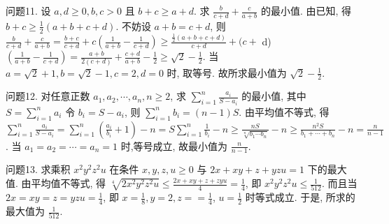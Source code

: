 问题11. 设 $a, d \geqslant 0, b, c>0$ 且 $b+c \geqslant a+d$. 求 $\frac{b}{c+d}+\frac{c}{a+b}$ 的最小值.
由已知, 得 $b+c \geqslant \frac{1}{2}(a+b+c+d)$. 不妨设 $a+b=c+d$, 则 $\frac{b}{c+d}+\frac{c}{a+b}=\frac{b+c}{c+d}+c\left(\frac{1}{a+b}-\frac{1}{c+d}\right) \geqslant \frac{\frac{1}{2}(a+b+c+d)}{c+d}+(c+$ d) $\left(\frac{1}{a+b}-\frac{1}{c+d}\right)=\frac{a+b}{2(c+d)}+\frac{c+d}{a+b}-\frac{1}{2} \geqslant \sqrt{2}-\frac{1}{2}$. 当 $a=\sqrt{2}+1, b= \sqrt{2}-1, c=2, d=0$ 时, 取等号.
故所求最小值为 $\sqrt{2}-\frac{1}{2}$.



问题12. 对任意正数 $a_1, a_2, \cdots, a_n, n \geqslant 2$, 求 $\sum_{i=1}^n \frac{a_i}{S-a_i}$ 的最小值, 其中 $S= \sum_{i=1}^n a_i$
令 $b_i=S-a_i$, 则 $\sum_{i=1}^n b_i=(n-1) S$. 由平均值不等式, 得 $\sum_{i=1}^n \frac{a_i}{S-a_i} =\sum_{i=1}^n\left(\frac{a_i}{b_i}+1\right)-n=S \sum_{i=1}^n \frac{1}{b_i}-n \geqslant \frac{n S}{\sqrt[n]{b_1 \cdots b_n}}-n \geqslant \frac{n^2 S}{b_1+\cdots+b_n}-n=\frac{n}{n-1}$. 当 $a_1=a_2=\cdots=a_n=1$ 时,等号成立, 故最小值为 $\frac{n}{n-1}$.



问题13. 求乘积 $x^2 y^2 z^2 u$ 在条件 $x, y, z, u \geqslant 0$ 与 $2 x+x y+z+y z u=1$ 下的最大值.
由平均值不等式, 得 $\sqrt[4]{2 x^2 y^2 z^2 u} \leqslant \frac{2 x+x y+z+z y u}{4}=\frac{1}{4}$, 即
$x^2 y^2 z^2 u \leqslant \frac{1}{512}$. 而且当 $2 x=x y=z=y z u=\frac{1}{4}$, 即 $x=\frac{1}{8}, y=2, z==\frac{1}{4}$, $u=\frac{1}{2}$ 时等式成立.
于是, 所求的最大值为 $\frac{1}{512}$.



